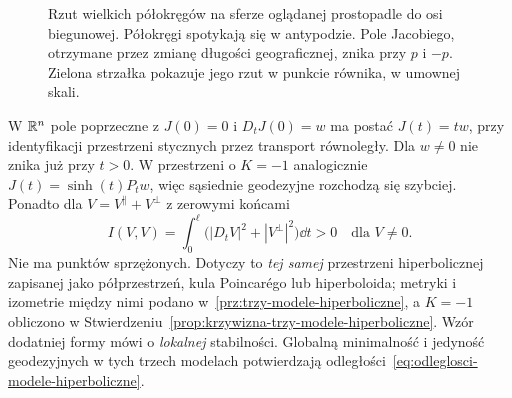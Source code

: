 \begin{figure}[htbp]
\centering
{}
\caption{Rzut wielkich półokręgów na sferze oglądanej prostopadle do osi biegunowej.
Półokręgi spotykają się w antypodzie. Pole Jacobiego, otrzymane przez zmianę
długości geograficznej, znika przy $p$ i $-p$. Zielona strzałka pokazuje jego
rzut w punkcie równika, w umownej skali.}
\label{fig:jacobi-sfera-ogniskowanie}
\end{figure}

\begin{przyklad}
\label{prz:jacobi-plaska-hiperboliczna}
W $\mathbb{R}^n$ pole poprzeczne z $J(0)=0$
i $D_tJ(0)=w$ ma postać $J(t)=tw$,
przy identyfikacji przestrzeni stycznych przez
transport równoległy. Dla $w\ne0$ nie znika już przy $t>0$.
W przestrzeni o $K=-1$ analogicznie
$J(t)=\sinh(t)P_tw$, więc sąsiednie geodezyjne
rozchodzą się szybciej. Ponadto dla
$V=V^\parallel+V^\perp$ z zerowymi końcami
\[
 I(V,V)=\int_0^\ell
        \bigl(|D_tV|^2+|V^\perp|^2\bigr)\dd t>0
 \quad\text{dla }V\ne0.
\]
Nie ma punktów sprzężonych. Dotyczy to
\emph{tej samej} przestrzeni hiperbolicznej
zapisanej jako półprzestrzeń, kula Poincarégo
lub hiperboloida; metryki i izometrie między
nimi podano w~\ref{prz:trzy-modele-hiperboliczne},
a $K=-1$ obliczono w
Stwierdzeniu~\ref{prop:krzywizna-trzy-modele-hiperboliczne}.
Wzór dodatniej formy mówi o \emph{lokalnej}
stabilności. Globalną minimalność i jedyność
geodezyjnych w tych trzech modelach potwierdzają
odległości~\eqref{eq:odleglosci-modele-hiperboliczne}.
\end{przyklad}

